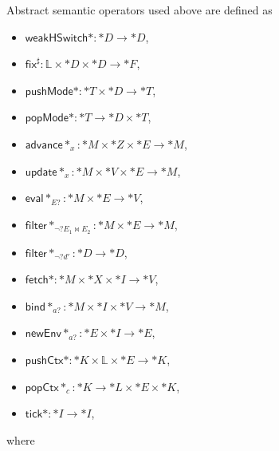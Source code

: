 \documentclass[a4paper]{article}
\newcommand*{\dom}[1]{\mathbb{#1}}
\newcommand*{\weakhsw}{\mathsf{weakHSwitch}}
\newcommand*{\update}{\mathsf{update}}
\newcommand*{\Advance}{\mathsf{advance}}
\newcommand*{\eval}{\mathsf{eval}}
\newcommand*{\fetch}{\mathsf{fetch}}
\newcommand*{\filter}{\mathsf{filter}}
\newcommand*{\pushMode}{\mathsf{pushMode}}
\newcommand*{\popMode}{\mathsf{popMode}}
\newcommand*{\bind}{\mathsf{bind}}
\newcommand*{\newEnv}{\mathsf{newEnv}}
\newcommand*{\pushCtx}{\mathsf{pushCtx}}
\newcommand*{\popCtx}{\mathsf{popCtx}}
\newcommand*{\tick}{\mathsf{tick}}
\begin{document}
Abstract semantic operators used above are defined as
\begin{itemize}
\item $\weakhsw* \colon \dom*D \to \dom*D$,
\item $\mathsf{fix}^\sharp \colon \dom L \times \dom*D \times \dom*D \to \dom*F$,
\item $\pushMode* \colon \dom*T \times \dom*D \to \dom*T$,
\item $\popMode* \colon \dom*T \to \dom*D \times \dom*T$,
\item $\Advance*_x \colon \dom*M \times \dom*Z \times \dom*E \to \dom*M$,
\item $\update*_x \colon \dom*M \times \dom*V \times \dom*E \to \dom*M$,
\item $\eval*_{E?} \colon \dom*M \times \dom*E \to \dom*V$,
\item $\filter*_{\neg? E_1 \bowtie E_2} \colon \dom*M \times \dom*E \to \dom*M$,
\item $\filter*_{\neg? d'} \colon \dom*D \to \dom*D$,
\item $\fetch* \colon \dom*M \times \dom*X \times \dom*I \to \dom*V$,
\item $\bind*_{a?} \colon \dom*M \times \dom*I \times \dom*V \to \dom*M$,
\item $\newEnv*_{a?} \colon \dom*E \times \dom*I \to \dom*E$,
\item $\pushCtx* \colon \dom*K \times \dom L \times \dom*E \to \dom*K$,
\item $\popCtx*_c \colon \dom*K \to \dom*L \times \dom*E \times \dom*K$,
\item $\tick* \colon \dom*I \to \dom*I$,
\end{itemize}
where
\end{document}
